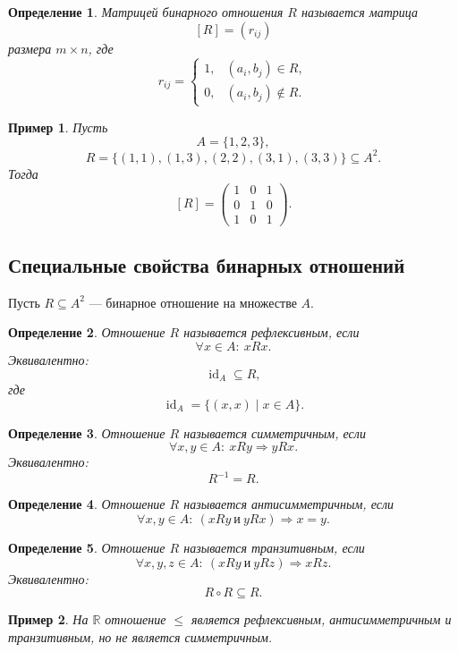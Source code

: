 \documentclass[12pt,a4paper]{article}
\newtheorem{definition}{Определение}
\newtheorem{example}{Пример}
\begin{document}
\begin{definition}
\emph{Матрицей бинарного отношения} $R$ называется матрица
\[
[R]=(r_{ij})
\]
размера $m\times n$, где
\[
r_{ij}=
\begin{cases}
1, & (a_i,b_j)\in R,\\
0, & (a_i,b_j)\notin R.
\end{cases}
\]
\end{definition}

\begin{example}
Пусть
\[
A=\{1,2,3\},
\]
\[
R=\{(1,1),(1,3),(2,2),(3,1),(3,3)\}\subseteq A^2.
\]
Тогда
\[
[R]=
\begin{pmatrix}
1&0&1\\
0&1&0\\
1&0&1
\end{pmatrix}.
\]
\end{example}

\subsection{Специальные свойства бинарных отношений}

Пусть $R\subseteq A^2$ --- бинарное отношение на множестве $A$.

\begin{definition}
Отношение $R$ называется \emph{рефлексивным}, если
\[
\forall x\in A:\ xRx.
\]
Эквивалентно:
\[
\operatorname{id}_A\subseteq R,
\]
где
\[
\operatorname{id}_A=\{(x,x)\mid x\in A\}.
\]
\end{definition}

\begin{definition}
Отношение $R$ называется \emph{симметричным}, если
\[
\forall x,y\in A:\ xRy\Rightarrow yRx.
\]
Эквивалентно:
\[
R^{-1}=R.
\]
\end{definition}

\begin{definition}
Отношение $R$ называется \emph{антисимметричным}, если
\[
\forall x,y\in A:\ (xRy\ \text{и}\ yRx)\Rightarrow x=y.
\]
\end{definition}

\begin{definition}
Отношение $R$ называется \emph{транзитивным}, если
\[
\forall x,y,z\in A:\ (xRy\ \text{и}\ yRz)\Rightarrow xRz.
\]
Эквивалентно:
\[
R\circ R\subseteq R.
\]
\end{definition}

\begin{example}
На $\mathbb R$ отношение $\leq$ является рефлексивным, антисимметричным и транзитивным, но не является симметричным.
\end{example}
\end{document}
